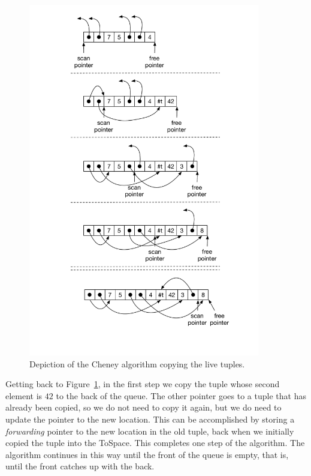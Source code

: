 \documentclass[11pt]{book}
\begin{document}
\begin{figure}[tbp]
\centering \includegraphics[width=0.9\textwidth]{figs/cheney}
\caption{Depiction of the Cheney algorithm copying the live tuples.}
\label{fig:cheney}
\end{figure}

Getting back to Figure~\ref{fig:cheney}, in the first step we copy the
tuple whose second element is $42$ to the back of the queue. The other
pointer goes to a tuple that has already been copied, so we do not
need to copy it again, but we do need to update the pointer to the new
location. This can be accomplished by storing a \emph{forwarding}
pointer to the new location in the old tuple, back when we initially
copied the tuple into the ToSpace. This completes one step of the
algorithm. The algorithm continues in this way until the front of the
queue is empty, that is, until the front catches up with the back.
\end{document}

